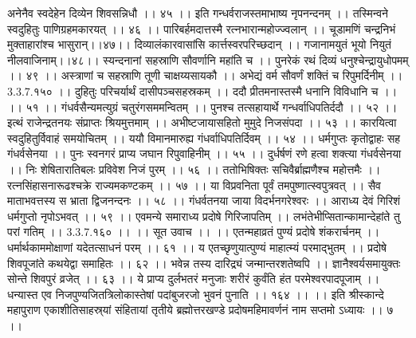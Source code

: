 अनेनैव स्वदेहेन दिव्येन शिवसन्निधौ ।। ४५ ।।
इति गन्धर्वराजस्तमाभाष्य नृपनन्दनम् ।।
तस्मिन्वने स्वदुहितुः पाणिग्रहमकारयत् ।। ४६ ।।
पारिबर्हमदात्तस्मै रत्नभारान्महोज्ज्वलान् ।।
चूडामणिं चन्द्रनिभं मुक्ताहारांश्च भासुरान्।।४७।।
दिव्यालंकारवासांसि कार्त्तस्वरपरिच्छदान् ।।
गजानामयुतं भूयो नियुतं नीलवाजिनाम्।।४८।।
स्यन्दनानां सहस्राणि सौवर्णानि महांति च ।।
पुनरेकं रथं दिव्यं धनुश्चेन्द्रायुधोपमम् ।। ४९ ।।
अस्त्राणां च सहस्राणि तूणी चाक्षय्यसायकौ ।।
अभेद्यं वर्म सौवर्णं शक्तिं च रिपुमर्दिनीम् ।। 3.3.7.१५० ।।
दुहितुः परिचर्यार्थं दासीपञ्चसहस्रकम् ।।
ददौ प्रीतमनास्तस्मै धनानि विविधानि च ।। ।। ५१ ।।
गंधर्वसैन्यमत्युग्रं चतुरंगसममन्वितम् ।।
पुनश्च तत्सहायार्थे गन्धर्वाधिपतिर्ददौ ।। ५२ ।।
इत्थं राजेन्द्रतनयः संप्राप्तः श्रियमुत्तमाम् ।।
अभीष्टजायासहितो मुमुदे निजसंपदा ।। ५३ ।।
कारयित्वा स्वदुहितुर्विवाहं समयोचितम् ।।
ययौ विमानमारुह्य गंधर्वाधिपतिर्दिवम् ।। ५४ ।।
धर्मगुप्तः कृतोद्वाहः सह गंधर्वसेनया ।।
पुनः स्वनगरं प्राप्य जघान रिपुवाहिनीम् ।। ५५ ।।
दुर्धर्षणं रणे हत्वा शक्त्या गंधर्वसेनया ।।
निः शेषितारातिबलः प्रविवेश निजं पुरम् ।। ५६ ।।
ततोभिषिक्तः सचिवैर्ब्राह्मणैश्च महोत्तमैः ।।
रत्नसिंहासनारूढश्चक्रे राज्यमकण्टकम् ।। ५७ ।।
या विप्रवनिता पूर्वं तमपुष्णात्स्वपुत्रवत् ।।
सैव माताभवत्तस्य स भ्राता द्विजनन्दनः ।। ५८ ।।
गंधर्वतनया जाया विदर्भनगरेश्वरः ।।
आराध्य देवं गिरिशं धर्मगुप्तो नृपोऽभवत् ।। ५९ ।।
एवमन्ये समाराध्य प्रदोषे गिरिजापतिम् ।।
लभंतेभीप्सितान्कामान्देहांते तु परां गतिम् ।। 3.3.7.१६० ।।
।। सूत उवाच ।। ।।
एतन्महाव्रतं पुण्यं प्रदोषे शंकरार्चनम् ।।
धर्मार्थकाममोक्षाणां यदेतत्साधनं परम् ।। ६१ ।।
य एतच्छृणुयात्पुण्यं माहात्म्यं परमाद्भुतम् ।।
प्रदोषे शिवपूजांते कथयेद्वा समाहितः ।। ६२ ।।
भवेन्न तस्य दारिद्र्यं जन्मान्तरशतेष्वपि ।।
ज्ञानैश्वर्यसमायुक्तः सोन्ते शिवपुरं व्रजेत् ।। ६३ ।।
ये प्राप्य दुर्लभतरं मनुजाः शरीरं कुर्वंति हंत परमेश्वरपादपूजाम् ।।
धन्यास्त एव निजपुण्यजितत्रिलोकास्तेषां पदांबुजरजो भुवनं पुनाति ।। १६४ ।। ।।
इति श्रीस्कान्दे महापुराण एकाशीतिसाहस्र्यां संहितायां तृतीये ब्रह्मोत्तरखण्डे प्रदोषमहिमावर्णनं नाम सप्तमो ऽध्यायः ।। ७ ।।
